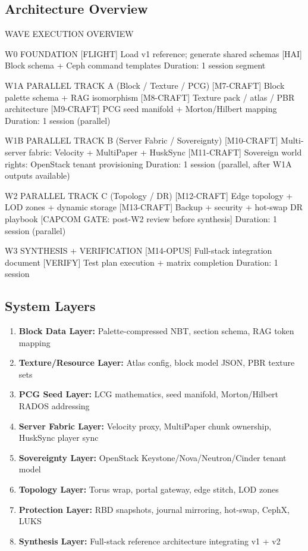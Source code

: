\documentclass[11pt,letterpaper]{article}
\begin{document}
\subsection{Architecture Overview}

\begin{asciibox}
WAVE EXECUTION OVERVIEW

W0  FOUNDATION
    [FLIGHT] Load v1 reference; generate shared schemas
    [HAI]    Block schema + Ceph command templates
    Duration: 1 session segment

W1A PARALLEL TRACK A (Block / Texture / PCG)
    [M7-CRAFT] Block palette schema + RAG isomorphism
    [M8-CRAFT] Texture pack / atlas / PBR architecture
    [M9-CRAFT] PCG seed manifold + Morton/Hilbert mapping
    Duration: 1 session (parallel)

W1B PARALLEL TRACK B (Server Fabric / Sovereignty)
    [M10-CRAFT] Multi-server fabric: Velocity + MultiPaper + HuskSync
    [M11-CRAFT] Sovereign world rights: OpenStack tenant provisioning
    Duration: 1 session (parallel, after W1A outputs available)

W2  PARALLEL TRACK C (Topology / DR)
    [M12-CRAFT] Edge topology + LOD zones + dynamic storage
    [M13-CRAFT] Backup + security + hot-swap DR playbook
    [CAPCOM GATE: post-W2 review before synthesis]
    Duration: 1 session (parallel)

W3  SYNTHESIS + VERIFICATION
    [M14-OPUS]  Full-stack integration document
    [VERIFY]    Test plan execution + matrix completion
    Duration: 1 session
\end{asciibox}

\subsection{System Layers}

\begin{enumerate}
  \item \textbf{Block Data Layer:} Palette-compressed NBT, section schema, RAG token mapping
  \item \textbf{Texture/Resource Layer:} Atlas config, block model JSON, PBR texture sets
  \item \textbf{PCG Seed Layer:} LCG mathematics, seed manifold, Morton/Hilbert RADOS addressing
  \item \textbf{Server Fabric Layer:} Velocity proxy, MultiPaper chunk ownership, HuskSync player sync
  \item \textbf{Sovereignty Layer:} OpenStack Keystone/Nova/Neutron/Cinder tenant model
  \item \textbf{Topology Layer:} Torus wrap, portal gateway, edge stitch, LOD zones
  \item \textbf{Protection Layer:} RBD snapshots, journal mirroring, hot-swap, CephX, LUKS
  \item \textbf{Synthesis Layer:} Full-stack reference architecture integrating v1 + v2
\end{enumerate}
\end{document}
